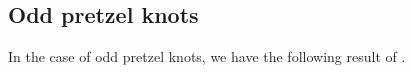 \documentclass{article}
\theoremstyle{plain}
\theoremstyle{definition}
\theoremstyle{plain}
\theoremstyle{plain}
\theoremstyle{plain}
\theoremstyle{remark}
\theoremstyle{remark}
\theoremstyle{plain}
\theoremstyle{plain}
\begin{document}
%


\subsection{Odd pretzel knots}

In the case of odd pretzel knots, we have the following result of \cite{sekino}. 
\end{document}
